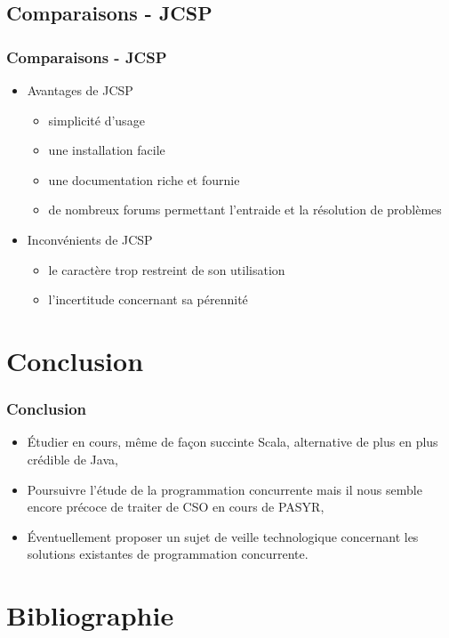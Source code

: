 \documentclass[slidetop,11pt]{beamer}
\begin{document}
\subsection{Comparaisons - JCSP}
\begin{frame}
\frametitle{Comparaisons - JCSP}
\begin{itemize}[<+->]
\item Avantages de JCSP
\begin{itemize}[<+->]
\item simplicité d'usage
\item une installation facile 
\item une documentation riche et fournie
\item de nombreux forums permettant l'entraide et la résolution de problèmes
\end{itemize}
\item Inconvénients de JCSP
\begin{itemize}[<+->]
\item le caractère trop restreint de son utilisation
\item l'incertitude concernant sa pérennité
\end{itemize}
\end{itemize}
\end{frame}


\section{Conclusion}
\begin{frame}
\frametitle{Conclusion}
\begin{itemize}[<+->]
\item \'Etudier en cours, même de façon succinte Scala, alternative de plus en plus crédible de Java,
\item Poursuivre l'étude de la programmation concurrente mais il nous semble encore précoce de traiter de CSO en cours de PASYR,
\item \'Eventuellement proposer un sujet de veille technologique concernant les solutions existantes de programmation concurrente.
\end{itemize}
\end{frame}

\section*{Bibliographie}
\end{document}

